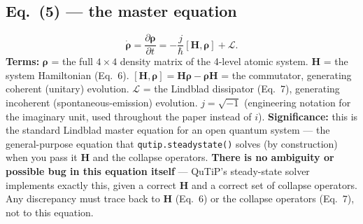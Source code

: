 \documentclass[11pt]{article}
\begin{document}
\subsection*{Eq.~(5) --- the master equation}
\begin{equation}
\dot{\boldsymbol\rho} = \frac{\partial\boldsymbol\rho}{\partial t} = -\frac{j}{\hbar}[\mathbf H,\boldsymbol\rho] + \mathcal L. \tag{5}
\end{equation}
\textbf{Terms:} $\boldsymbol\rho$ = the full $4\times4$ density matrix of
the 4-level atomic system. $\mathbf H$ = the system Hamiltonian
(Eq.~6). $[\mathbf H,\boldsymbol\rho]=\mathbf H\boldsymbol\rho-\boldsymbol\rho\mathbf H$
= the commutator, generating coherent (unitary) evolution. $\mathcal L$
= the Lindblad dissipator (Eq.~7), generating incoherent
(spontaneous-emission) evolution. $j=\sqrt{-1}$ (engineering notation
for the imaginary unit, used throughout the paper instead of $i$).
\textbf{Significance:} this is the standard Lindblad master equation for
an open quantum system --- the general-purpose equation that
\texttt{qutip.steadystate()} solves (by construction) when you pass it
$\mathbf H$ and the collapse operators. \textbf{There is no ambiguity or
possible bug in this equation itself} --- QuTiP's steady-state solver
implements exactly this, given a correct $\mathbf H$ and a correct set
of collapse operators. Any discrepancy must trace back to $\mathbf H$
(Eq.~6) or the collapse operators (Eq.~7), not to this equation.
\end{document}
